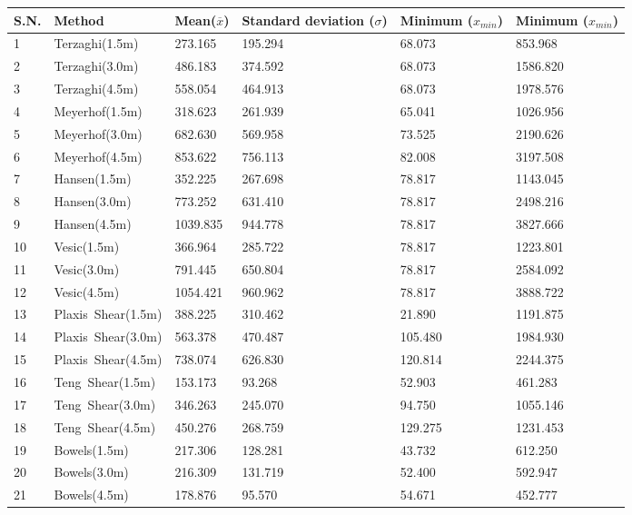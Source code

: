 \begin{tabularx}{\textwidth}{ | l | p{} | X | X | X | X | }
\hline
 \textbf{S.N.} & \textbf{Method} & \textbf{Mean($\overline{x}$)} & \textbf{Standard deviation ($\sigma$)} & \textbf{Minimum ($x_{min}$)} & \textbf{Minimum ($x_{min}$)}\\
\hline
 1 & \mbox{Terzaghi(1.5m)} & 273.165 & 195.294 & 68.073 & 853.968 \\
 2 & \mbox{Terzaghi(3.0m)} & 486.183 & 374.592 & 68.073 & 1586.820 \\
 3 & \mbox{Terzaghi(4.5m)} & 558.054 & 464.913 & 68.073 & 1978.576 \\
\hline
 4 & \mbox{Meyerhof(1.5m)} & 318.623 & 261.939 & 65.041 & 1026.956 \\
 5 & \mbox{Meyerhof(3.0m)} & 682.630 & 569.958 & 73.525 & 2190.626 \\
 6 & \mbox{Meyerhof(4.5m)} & 853.622 & 756.113 & 82.008 & 3197.508 \\
\hline
 7 & \mbox{Hansen(1.5m)} & 352.225 & 267.698 & 78.817 & 1143.045 \\
 8 & \mbox{Hansen(3.0m)} & 773.252 & 631.410 & 78.817 & 2498.216 \\
 9 & \mbox{Hansen(4.5m)} & 1039.835 & 944.778 & 78.817 & 3827.666 \\
\hline
 10 & \mbox{Vesic(1.5m)} & 366.964 & 285.722 & 78.817 & 1223.801 \\
 11 & \mbox{Vesic(3.0m)} & 791.445 & 650.804 & 78.817 & 2584.092 \\
 12 & \mbox{Vesic(4.5m)} & 1054.421 & 960.962 & 78.817 & 3888.722 \\
\hline
 13 & \mbox{Plaxis Shear(1.5m)} & 388.225 & 310.462 & 21.890 & 1191.875 \\
 14 & \mbox{Plaxis Shear(3.0m)} & 563.378 & 470.487 & 105.480 & 1984.930 \\
 15 & \mbox{Plaxis Shear(4.5m)} & 738.074 & 626.830 & 120.814 & 2244.375 \\
\hline
 16 & \mbox{Teng Shear(1.5m)} & 153.173 & 93.268 & 52.903 & 461.283 \\
 17 & \mbox{Teng Shear(3.0m)} & 346.263 & 245.070 & 94.750 & 1055.146 \\
 18 & \mbox{Teng Shear(4.5m)} & 450.276 & 268.759 & 129.275 & 1231.453 \\
\hline
 19 & \mbox{Bowels(1.5m)} & 217.306 & 128.281 & 43.732 & 612.250 \\
 20 & \mbox{Bowels(3.0m)} & 216.309 & 131.719 & 52.400 & 592.947 \\
 21 & \mbox{Bowels(4.5m)} & 178.876 & 95.570 & 54.671 & 452.777 \\

\end{tabularx}
